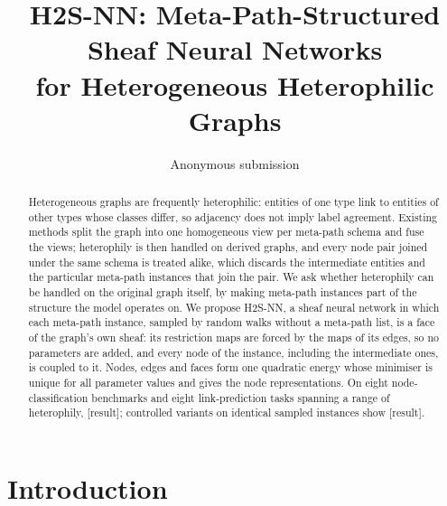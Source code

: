 \documentclass{article}
\title{H2S-NN: Meta-Path-Structured Sheaf Neural Networks\\ for Heterogeneous Heterophilic Graphs}
\author{
    Anonymous submission
}
\newcommand{\method}{\textsc{H2S-NN}}
\newcommand{\res}{{\scriptsize[result]}}
\begin{document}
\maketitle

\begin{abstract}
Heterogeneous graphs are frequently heterophilic: entities of one type link to entities of other types whose classes differ, so adjacency does not imply label agreement. Existing methods split the graph into one homogeneous view per meta-path schema and fuse the views; heterophily is then handled on derived graphs, and every node pair joined under the same schema is treated alike, which discards the intermediate entities and the particular meta-path instances that join the pair. We ask whether heterophily can be handled on the original graph itself, by making meta-path instances part of the structure the model operates on. We propose \method{}, a sheaf neural network in which each meta-path instance, sampled by random walks without a meta-path list, is a face of the graph's own sheaf: its restriction maps are forced by the maps of its edges, so no parameters are added, and every node of the instance, including the intermediate ones, is coupled to it. Nodes, edges and faces form one quadratic energy whose minimiser is unique for all parameter values and gives the node representations. On eight node-classification benchmarks and eight link-prediction tasks spanning a range of heterophily, \res{}; controlled variants on identical sampled instances show \res{}.
\end{abstract}

\section{Introduction}
\label{sec:introduction}
\end{document}

